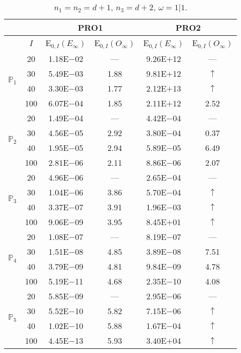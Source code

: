 \begin{table}[H]
\caption{$n_1=n_2=d+1$,  $n_3=d+2$, $\omega=1|1$.}
\setlength{\tabcolsep}{5pt}
\centering
\begin{tabular}{@{}l c c c c c@{}}
\toprule
 &  & \multicolumn{2}{c}{PRO1} & \multicolumn{2}{c}{PRO2}\\
\midrule
 & $I$ & E$_{0,I}(E_{\infty})$ & E$_{0,I}(O_{\infty})$ & E$_{0,I}(E_{\infty})$ & E$_{0,I}(O_{\infty})$\\
\midrule
\multirow{4}{*}{$\mathbb{P}_{1}$}
 & 20 & 1.18E$-$02 & --- & 9.26E$+$12 & ---\\
 & 30 & 5.49E$-$03 & 1.88 & 9.81E$+$12 & $\uparrow$ \\
 & 40 & 3.30E$-$03 & 1.77 & 2.12E$+$13 & $\uparrow$ \\
 & 100 & 6.07E$-$04 & 1.85 & 2.11E$+$12 & 2.52 \\
\midrule
\multirow{4}{*}{$\mathbb{P}_{2}$}
 & 20 & 1.49E$-$04 & --- & 4.42E$-$04 & ---\\
 & 30 & 4.56E$-$05 & 2.92 & 3.80E$-$04 & 0.37 \\
 & 40 & 1.95E$-$05 & 2.94 & 5.89E$-$05 & 6.49 \\
 & 100 & 2.81E$-$06 & 2.11 & 8.86E$-$06 & 2.07 \\
\midrule
\multirow{4}{*}{$\mathbb{P}_{3}$}
 & 20 & 4.96E$-$06 & --- & 2.65E$-$04 & ---\\
 & 30 & 1.04E$-$06 & 3.86 & 5.70E$-$04 & $\uparrow$ \\
 & 40 & 3.37E$-$07 & 3.91 & 1.96E$-$03 & $\uparrow$ \\
 & 100 & 9.06E$-$09 & 3.95 & 8.45E$+$01 & $\uparrow$ \\
\midrule
\multirow{4}{*}{$\mathbb{P}_{4}$}
 & 20 & 1.08E$-$07 & --- & 8.19E$-$07 & ---\\
 & 30 & 1.51E$-$08 & 4.85 & 3.89E$-$08 & 7.51 \\
 & 40 & 3.79E$-$09 & 4.81 & 9.84E$-$09 & 4.78 \\
 & 100 & 5.19E$-$11 & 4.68 & 2.35E$-$10 & 4.08 \\
\midrule
\multirow{4}{*}{$\mathbb{P}_{5}$}
 & 20 & 5.85E$-$09 & --- & 2.95E$-$06 & ---\\
 & 30 & 5.52E$-$10 & 5.82 & 7.15E$-$06 & $\uparrow$ \\
 & 40 & 1.02E$-$10 & 5.88 & 1.67E$-$04 & $\uparrow$ \\
 & 100 & 4.45E$-$13 & 5.93 & 3.40E$+$04 & $\uparrow$ \\
\bottomrule
\end{tabular}
\label{Table:PRO:Rodrigo:Test11}
\end{table}
